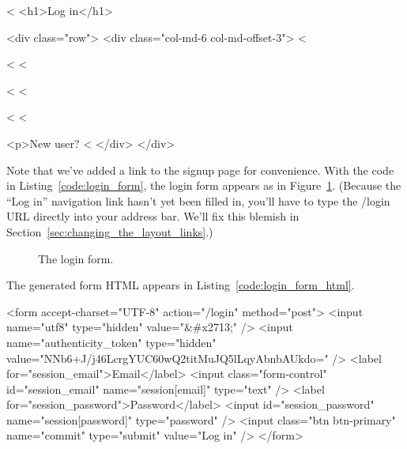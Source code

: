 \begin{codelisting}
\label{code:login_form}
\begin{code}
<%
<h1>Log in</h1>

<div class="row">
  <div class="col-md-6 col-md-offset-3">
    <%

      <%
      <%

      <%
      <%

      <%
    <%

    <p>New user? <%
  </div>
</div>
\end{code}
\end{codelisting}

\noindent Note that we've added a link to the signup page for convenience. With the code in Listing~\ref{code:login_form}, the login form appears as in Figure~\ref{fig:login_form}. (Because the ``Log in'' navigation link hasn't yet been filled in, you'll have to type the /login URL directly into your address bar. We'll fix this blemish in Section~\ref{sec:changing_the_layout_links}.)

\begin{figure}
\begin{center}
\end{center}
\caption{The login form.\label{fig:login_form}}
\end{figure}

The generated form HTML appears in Listing~\ref{code:login_form_html}.

\begin{codelisting}
\label{code:login_form_html}
\begin{code}
<form accept-charset="UTF-8" action="/login" method="post">
  <input name="utf8" type="hidden" value="&#x2713;" />
  <input name="authenticity_token" type="hidden"
         value="NNb6+J/j46LcrgYUC60wQ2titMuJQ5lLqyAbnbAUkdo=" />
  <label for="session_email">Email</label>
  <input class="form-control" id="session_email"
         name="session[email]" type="text" />
  <label for="session_password">Password</label>
  <input id="session_password" name="session[password]"
         type="password" />
  <input class="btn btn-primary" name="commit" type="submit"
       value="Log in" />
</form>
\end{code}
\end{codelisting}

